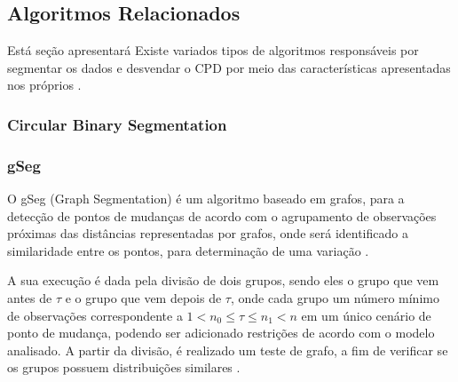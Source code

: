 


\subsection{Algoritmos Relacionados}

Está seção apresentará 
Existe variados tipos de algoritmos responsáveis por segmentar os dados e desvendar o CPD por meio das características apresentadas nos próprios \cite{Aminikhanghahi2017}.


\subsubsection{Circular Binary Segmentation}

\subsubsection{gSeg}

O gSeg (Graph Segmentation) é um algoritmo baseado em grafos, para a detecção de pontos de mudanças de acordo com o agrupamento de observações próximas das distâncias representadas por grafos, onde será identificado a similaridade entre os pontos, para determinação de uma variação 
\cite{Chen2015}. 

A sua execução é dada pela divisão de dois grupos, sendo eles o grupo que vem antes de $\tau$ e o grupo que vem depois de $\tau$, onde cada grupo um número mínimo de observações correspondente a $1 < n_{0} \leq \tau \leq n_{1} < n$ em um único cenário de ponto de mudança, podendo ser adicionado restrições de acordo com o modelo analisado. A partir da divisão, é realizado um teste de grafo, a fim de verificar se os grupos possuem distribuições similares \cite{Chen2015}. 

